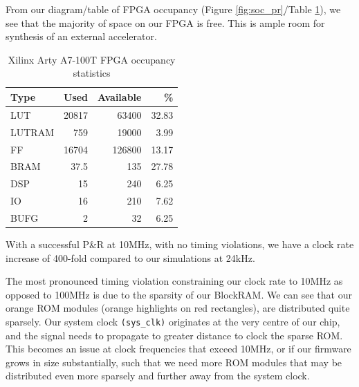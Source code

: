 \documentclass[a4paper,8pt]{report}
\begin{document}
From our diagram/table of FPGA occupancy (Figure \ref{fig:soc_pr}/Table
\ref{table:soc_pr}), we see that the majority of space on our FPGA is
free. This is ample room for synthesis of an external accelerator.
\begin{table}[b]
  \centering
  \begin{tabular}{l|r|r|r}
    \toprule
    Type  & Used & Available & \% \\
    \midrule
    LUT   &	20817&	63400	&32.83 \\
    LUTRAM&	759	 &19000	  &3.99 \\
    FF	  &16704 &126800	&13.17 \\
    BRAM	&37.5	 &135	    &27.78 \\
    DSP	  &15	   &240	    &6.25 \\ 
    IO	  &16	   &210	    &7.62\\ 
    BUFG	&2	   &32	    &6.25\\
    \bottomrule
  \end{tabular}
  \caption{Xilinx Arty A7-100T FPGA occupancy statistics}
  \label{table:soc_pr}
\end{table}

With a successful P\&R at 10MHz, with no timing violations, we have a clock rate
increase of 400-fold compared to our simulations at 24kHz.

The most pronounced timing violation constraining our clock rate to 10MHz as
opposed to 100MHz is due to the sparsity of our BlockRAM. We can see that our
orange ROM modules (orange highlights on red rectangles), are distributed quite
sparsely. Our system clock \texttt{(sys\_clk)} originates at the very centre of
our chip, and the signal needs to propagate to greater distance to clock the
sparse ROM. This becomes an issue at clock frequencies that exceed 10MHz, or if
our firmware grows in size substantially, such that we need more ROM modules
that may be distributed even more sparsely and further away from the system clock.
\end{document}
